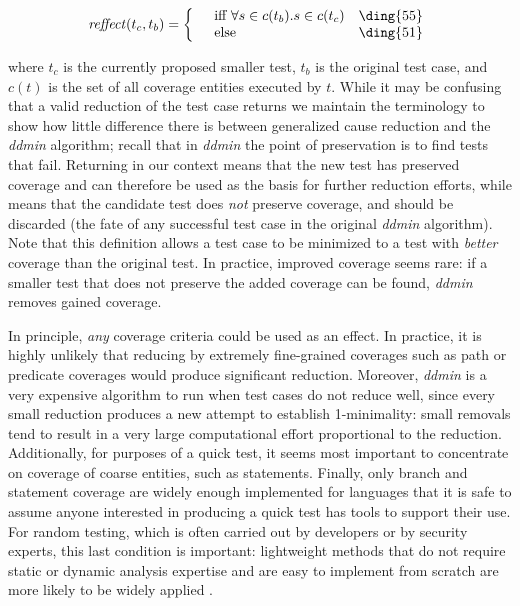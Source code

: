 \[ \mathit{reffect}(t_c,t_b) = \left\{ \begin{array}{lll}
        & \mbox{iff $\forall s \in c(t_b) . s\in c(t_c)$} & \mbox{\ding{55}} \\
        & \mbox{else} & \mbox{\ding{51}}\end{array} \right. \]

\noindent where $t_c$ is the currently proposed smaller test, $t_b$ is
the original test case, and $c(t)$ is the set of all coverage entities
executed by $t$.  While it may be confusing that a valid reduction of
the test case returns  we maintain the terminology to show
how little difference there is between generalized cause reduction and
the \emph{ddmin} algorithm; recall that in \emph{ddmin} the point of
preservation is to find tests that fail. Returning  in our
context means that the new test has preserved coverage and can
therefore be used as the basis for further reduction efforts, while
 means that the candidate test does \emph{not} preserve
coverage, and should be discarded (the fate of any successful test
case in the original \emph{ddmin} algorithm).  Note that this
definition allows a test case to be minimized to a test with
\emph{better} coverage than the original test.  In practice, improved
coverage seems rare: if a smaller test that does not preserve the
added coverage can be found, \emph{ddmin} removes gained
coverage.

In principle, \emph{any} coverage criteria could be used as an effect.
In practice, it is highly unlikely that reducing by extremely
fine-grained coverages such as path or predicate coverages
\cite{ISSTA13} would produce significant reduction.  Moreover,
\emph{ddmin} is a very expensive algorithm to run when test cases do
not reduce well, since every small reduction produces a new attempt to
establish 1-minimality: small removals tend to result in a very large
computational effort proportional to the reduction.  Additionally, for
purposes of a quick test, it seems most important to concentrate on
coverage of coarse entities, such as statements.  Finally, only branch
and statement coverage are widely enough implemented for languages
that it is safe to assume anyone interested in producing a quick test
has tools to support their use.  For random testing, which is often
carried out by developers or by security experts, this last condition
is important: lightweight methods that do not require static or
dynamic analysis expertise and are easy to implement from scratch are
more likely to be widely applied \cite{ISSRE}.  




